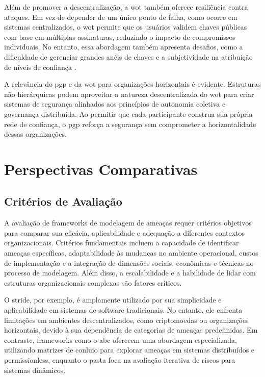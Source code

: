 Além de promover a descentralização, a \gls{wot} também oferece resiliência
contra ataques. Em vez de depender de um único ponto de falha, como ocorre em
sistemas centralizados, o \gls{wot} permite que os usuários validem chaves públicas
com base em múltiplas assinaturas, reduzindo o impacto de compromissos
individuais. No entanto, essa abordagem também apresenta desafios, como a
dificuldade de gerenciar grandes anéis de chaves e a subjetividade na atribuição
de níveis de confiança \cite{Pgp}.

A relevância do \gls{pgp} e da \gls{wot} para organizações horizontais é evidente.
Estruturas não hierárquicas podem aproveitar a natureza descentralizada do \gls{wot}
para criar sistemas de segurança alinhados aos princípios de autonomia coletiva
e governança distribuída. Ao permitir que cada participante construa sua própria
rede de confiança, o \gls{pgp} reforça a segurança sem comprometer a horizontalidade
dessas organizações.

\section{Perspectivas Comparativas}
\label{sec:comparative_perspectives}

\subsection{Critérios de Avaliação}
\label{subsec:criteria_evaluation}

A avaliação de frameworks de modelagem de ameaças requer critérios
objetivos para comparar sua eficácia, aplicabilidade e adequação a
diferentes contextos organizacionais. Critérios fundamentais incluem a
capacidade de identificar ameaças específicas, adaptabilidade às
mudanças no ambiente operacional, custos de implementação e a
integração de dimensões sociais, econômicas e técnicas no processo de
modelagem. Além disso, a escalabilidade e a habilidade de lidar com
estruturas organizacionais complexas são fatores críticos.

O \gls{stride}, por exemplo, é amplamente utilizado por sua simplicidade e
aplicabilidade em sistemas de software tradicionais. No entanto, ele
enfrenta limitações em ambientes descentralizados, como criptomoedas
ou organizações horizontais, devido à sua dependência de categorias de
ameaças predefinidas. Em contraste, frameworks como
o \gls{abc} oferecem uma abordagem especializada,
utilizando matrizes de conluio para explorar ameaças em
sistemas distribuídos e permissionless, enquanto o \gls{pasta} foca na
avaliação iterativa de riscos para sistemas dinâmicos.

